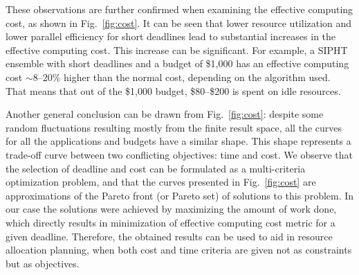 \documentclass{sig-alternate}
\begin{document}
These observations are further confirmed when examining the effective computing
cost, as shown in Fig.~\ref{fig:cost}. It can be seen that lower resource
utilization and lower parallel efficiency for short deadlines lead to
substantial increases in the effective computing cost. This increase can be 
significant. For example, a SIPHT ensemble with short deadlines and a budget
of \$1,000 has an effective computing cost $\sim$8--20\% higher than the 
normal cost, depending on the algorithm used. That means that out of the 
\$1,000 budget, \$80--\$200 is spent on idle resources.

Another general conclusion can be drawn from Fig.~\ref{fig:cost}: despite some
random fluctuations resulting mostly from the finite result space, all the
curves for all the applications and budgets have a similar shape. This shape
represents a trade-off curve between two conflicting objectives: time and cost.
We observe that the selection of deadline and cost can be formulated as a
multi-criteria optimization problem, and that the curves presented in 
Fig.~\ref{fig:cost} are approximations of the Pareto front (or Pareto set) of
solutions to this problem. In our case the solutions were achieved by maximizing
the amount of work done, which directly results in minimization of effective 
computing cost metric for a given deadline. Therefore, the obtained results 
can be used to aid in resource allocation planning, when both cost and time 
criteria are given not as constraints but as objectives.

       
\end{document}
